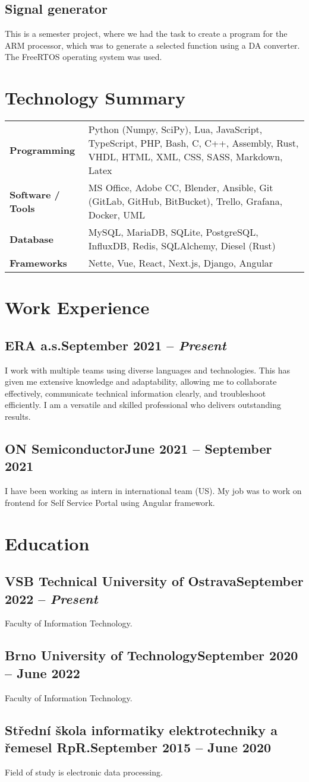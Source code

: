 \documentclass{article}
\newcommand{\dsubsection}[2]{
    \subsection{\textbf{\large{#1}}\hfill\textmd{\small{#2}}}
}
\begin{document}
\subsection{Signal generator}

This is a semester project, where we had the task to create a program for the ARM processor, which was to generate a
selected function using a DA converter.  The FreeRTOS operating system was used.


\section{Technology Summary}

{\renewcommand{\arraystretch}{1.5}%
\begin{tabularx}{\textwidth}{ >{\bfseries}l X }
    Programming       & Python (Numpy, SciPy), Lua, JavaScript, TypeScript, PHP, Bash, C, C++, Assembly, Rust, VHDL, HTML, XML, CSS, SASS, Markdown, Latex \\
    Software / Tools  & MS Office, Adobe CC, Blender, Ansible, Git (GitLab, GitHub, BitBucket), Trello, Grafana, Docker, UML \\
    Database          & MySQL, MariaDB, SQLite, PostgreSQL, InfluxDB, Redis, SQLAlchemy, Diesel (Rust) \\
    Frameworks        & Nette, Vue, React, Next.js, Django, Angular \\
\end{tabularx}}


\section{Work Experience}

\dsubsection{ERA a.s.}{September 2021 -- \textit{Present}}

I work with multiple teams using diverse languages and technologies. This has given me extensive knowledge and adaptability,
allowing me to collaborate effectively, communicate technical information clearly, and troubleshoot efficiently. I am a versatile and skilled
professional who delivers outstanding results.

\dsubsection{ON Semiconductor}{June 2021 -- September 2021}

I have been working as intern in international team (US). My job was to work on frontend for Self Service Portal using Angular framework.


\section{Education}

\dsubsection{VSB Technical University of Ostrava}{September 2022 -- \textit{Present}}

Faculty of Information Technology.

\dsubsection{Brno University of Technology}{September 2020 -- {June 2022}}

Faculty of Information Technology.

\dsubsection{Střední škola informatiky elektrotechniky a řemesel RpR.}{September 2015 -- June 2020}

Field of study is electronic data processing.
\end{document}
